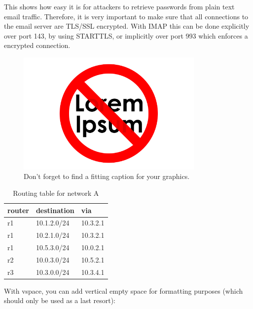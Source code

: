 \documentclass[parskip=full]{scrartcl}
\begin{document}
This shows how easy it is for attackers to retrieve passwords from plain text email traffic. Therefore, it is very important to make sure that all connections to the email server are TLS/SSL encrypted. With IMAP this can be done explicitly over port 143, by using STARTTLS, or implicitly over port 993 which enforces a encrypted connection.

\begin{figure}[ht]
 \centering %
 \includegraphics[height=6cm]{images/loremipsum.png} %
 \caption{Don't forget to find a fitting caption for your graphics.} 
 \label{fig:lorem} %
\end{figure} 


\begin{table}[hb]
	\centering
	\caption{Routing table for network A}
	\label{tab:routing}
	\begin{tabular}{lll}
		\toprule
		\textbf{router} & \textbf{destination} & \textbf{via}  \\ \midrule
		r1 & 10.1.2.0/24 & 10.3.2.1 \\
		r1 & 10.2.1.0/24 & 10.3.2.1 \\
		r1 & 10.5.3.0/24 & 10.0.2.1 \\
		\midrule
		r2 & 10.0.3.0/24 & 10.5.2.1 \\
		\midrule
		r3 & 10.3.0.0/24 & 10.3.4.1 \\
		\bottomrule
	\end{tabular}
\end{table}
With vspace, you can add vertical empty space for formatting purposes (which should only be used as a last resort):
\vspace*{1cm}
\end{document}
